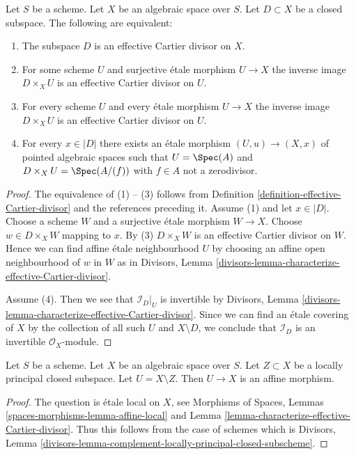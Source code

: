 \begin{lemma}
\label{lemma-characterize-effective-Cartier-divisor}
Let $S$ be a scheme. Let $X$ be an algebraic space over $S$.
Let $D \subset X$ be a closed subspace.
The following are equivalent:
\begin{enumerate}
\item The subspace $D$ is an effective Cartier divisor on $X$.
\item For some scheme $U$ and surjective \'etale morphism $U \to X$
the inverse image $D \times_X U$ is an effective Cartier divisor on $U$.
\item For every scheme $U$ and every \'etale morphism $U \to X$
the inverse image $D \times_X U$ is an effective Cartier divisor on $U$.
\item For every $x \in |D|$ there exists an \'etale morphism
$(U, u) \to (X, x)$ of pointed algebraic spaces such that $U = \Spec(A)$
and $D \times_X U = \Spec(A/(f))$ with $f \in A$ not a zerodivisor.
\end{enumerate}
\end{lemma}

\begin{proof}
The equivalence of (1) -- (3) follows from
Definition \ref{definition-effective-Cartier-divisor}
and the references preceding it.
Assume (1) and let $x \in |D|$. Choose a scheme $W$ and a
surjective \'etale morphism
$W \to X$. Choose $w \in D \times_X W$ mapping to $x$.
By (3) $D \times_X W$ is an effective Cartier
divisor on $W$. Hence we can find affine \'etale neighbourhood $U$
by choosing an affine open neighbourhood of $w$ in $W$ as in
Divisors, Lemma \ref{divisors-lemma-characterize-effective-Cartier-divisor}.

\medskip\noindent
Assume (4). Then we see that $\mathcal{I}_D|_U$ is invertible by
Divisors, Lemma \ref{divisors-lemma-characterize-effective-Cartier-divisor}.
Since we can find an \'etale covering of $X$ by the collection of
all such $U$ and $X \setminus D$, we conclude that
$\mathcal{I}_D$ is an invertible $\mathcal{O}_X$-module.
\end{proof}

\begin{lemma}
\label{lemma-complement-locally-principal-closed-subscheme}
Let $S$ be a scheme. Let $X$ be an algebraic space over $S$.
Let $Z \subset X$ be a locally principal closed
subspace. Let $U = X \setminus Z$. Then $U \to X$ is an affine morphism.
\end{lemma}

\begin{proof}
The question is \'etale local on $X$, see
Morphisms of Spaces, Lemmas \ref{spaces-morphisms-lemma-affine-local}
and
Lemma \ref{lemma-characterize-effective-Cartier-divisor}.
Thus this follows from the case of schemes which is
Divisors, Lemma
\ref{divisors-lemma-complement-locally-principal-closed-subscheme}.
\end{proof}

